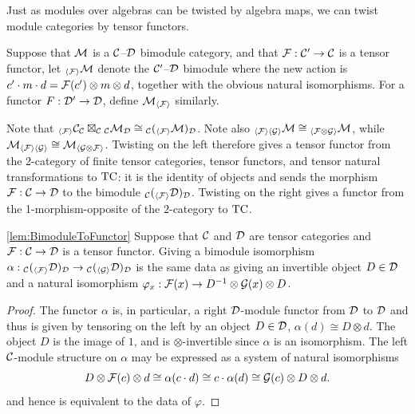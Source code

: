 \documentclass{amsart}
\begin{document}
Just as modules over algebras can be twisted by algebra maps, we can twist module categories by tensor functors.

\begin{definition}
Suppose that $\mathcal M$ is a $\mathcal C$--$\mathcal D$ bimodule category, and that $\mathcal F: \mathcal C' \rightarrow \mathcal C$ is a tensor functor, let
${}_{\langle \mathcal F \rangle} \mathcal M$ denote the $\mathcal C'$--$\mathcal D$ bimodule where the new action is $c' \cdot m \cdot d = \mathcal F(c') \otimes m \otimes d$, together with the obvious natural isomorphisms.  For a functor $F: \mathcal D' \rightarrow \mathcal D$, define $\mathcal M_{\langle \mathcal F \rangle}$ similarly.
\end{definition}

Note that ${}_{\langle \mathcal F \rangle} \mathcal C_\mathcal C \boxtimes_{\mathcal C} {}_{\mathcal C} \mathcal M_\mathcal D \cong {}_{\mathcal C} ({}_{\langle \mathcal F \rangle} \mathcal M)_\mathcal D$.  Note also ${}_{\langle \mathcal F \rangle \langle \mathcal G \rangle} \mathcal M \cong {}_{\langle \mathcal F \otimes \mathcal G \rangle} \mathcal M$, while $\mathcal M_{\langle \mathcal F \rangle \langle \mathcal G \rangle} \cong  \mathcal M_{\langle \mathcal G \otimes \mathcal F \rangle}$.  Twisting on the left therefore gives a tensor functor from the $2$-category of finite tensor categories, tensor functors, and tensor natural transformations to $\mathrm{TC}$: it is the identity of objects and sends the morphism $\mathcal F: \mathcal C \rightarrow \mathcal D$ to the bimodule ${}_{\mathcal C} ({}_{\langle \mathcal F \rangle} \mathcal D)_{\mathcal D}$.  Twisting on the right gives a functor from the 1-morphism-opposite of the $2$-category to $\mathrm{TC}$.

\begin{lemma} \ref{lem:BimoduleToFunctor}
Suppose that $\mathcal C$ and $\mathcal D$ are tensor categories and $\mathcal F: \mathcal C \rightarrow \mathcal D$ is a tensor functor.
Giving a bimodule isomorphism $\alpha:{}_{\mathcal C} ({}_{\langle \mathcal F \rangle} \mathcal D)_\mathcal D \rightarrow {}_{\mathcal C} ({}_{\langle \mathcal G \rangle} \mathcal D)_\mathcal D$ is the same data as giving an invertible object $D \in \mathcal D$ and a natural isomorphism $\varphi_x: \mathcal F(x) \rightarrow D^{-1} \otimes \mathcal G(x) \otimes D$.
\end{lemma}
\begin{proof}
The functor $\alpha$ is, in particular, a right $\mathcal D$-module functor from $\mathcal D$ to $\mathcal D$ and thus is given by tensoring on the left by an object $D \in \mathcal D$, $\alpha(d) \cong D \otimes d$. The object $D$ is the image of $1$, and is $\otimes$-invertible since $\alpha$ is an isomorphism. The left $\mathcal C$-module structure on $\alpha$ may be expressed as a system of natural isomorphisms
\begin{equation*}
	D \otimes \mathcal F(c) \otimes d \cong \alpha (c \cdot d) \cong c \cdot \alpha(d) \cong \mathcal G(c) \otimes D \otimes d.
\end{equation*}
and hence is equivalent to the data of $\varphi$. 
\end{proof}
\end{document}
